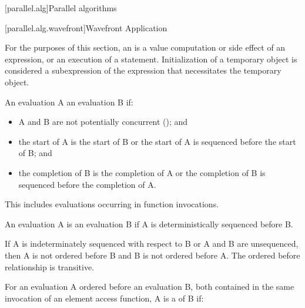 
[parallel.alg]{Parallel algorithms}

[parallel.alg.wavefront]{Wavefront Application}

\pnum
For the purposes of this section, an  is a value
computation or side effect of an expression, or an execution of a statement.
Initialization of a temporary object is considered a subexpression of the
expression that necessitates the temporary object.

\pnum
An evaluation A  an evaluation B if:

\begin{itemize}
\item A and B are not potentially concurrent (); and
\item the start of A is the start of B or the start of A is sequenced before the start of B; and
\item the completion of B is the completion of A or the completion of B is sequenced before the completion of A.
\end{itemize}

\begin{note}
This includes evaluations occurring in function invocations.
\end{note}

\pnum
An evaluation A is  an evaluation B if A is
deterministically sequenced before B. \begin{note}If A is indeterminately
sequenced with respect to B or A and B are unsequenced, then A is not ordered
before B and B is not ordered before A. The ordered before relationship is
transitive.\end{note}

\pnum
For an evaluation A ordered before an evaluation B, both contained in the
same invocation of an element access function, A is a  of B if:

